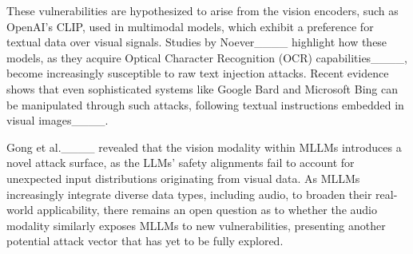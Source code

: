 These vulnerabilities are hypothesized to arise from the vision encoders, such as OpenAI’s CLIP, used in multimodal models, which exhibit a preference for textual data over visual signals. Studies by Noever____ highlight how these models, as they acquire Optical Character Recognition (OCR) capabilities____, become increasingly susceptible to raw text injection attacks. Recent evidence shows that even sophisticated systems like Google Bard and Microsoft Bing can be manipulated through such attacks, following textual instructions embedded in visual images____. 

Gong et al.____ revealed that the vision modality within MLLMs introduces a novel attack surface, as the LLMs’ safety alignments fail to account for unexpected input distributions originating from visual data. As MLLMs increasingly integrate diverse data types, including audio, to broaden their real-world applicability, there remains an open question as to whether the audio modality similarly exposes MLLMs to new vulnerabilities, presenting another potential attack vector that has yet to be fully explored.

